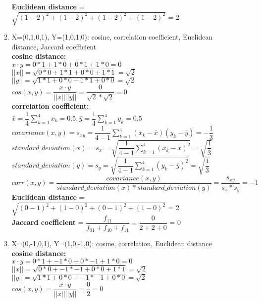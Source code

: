 \documentclass{article}%
\begin{document}
\begin{enumerate}
\begin{enumerate}
		\textbf{Euclidean distance} = $\sqrt{(1-2)^2 + (1-2)^2 + (1-2)^2 + (1-2)^2 }$ = 2\\
			
		\item X=(0,1,0,1), Y=(1,0,1,0): cosine, correlation coefficient, Euclidean distance, Jaccard coefficient \\
		\textbf{cosine distance:} \\
		$ x \cdot  y = 0*1+1*0+0*1+1*0 = 0$ \\
		$ ||x|| = \sqrt{0*0 + 1*1 + 0*0 + 1*1} = \sqrt{2} $ \\
		$ ||y|| = \sqrt{1*1 + 0*0 + 1*1 + 0*0} = \sqrt{2} $ \\
		$ cos(x,y) = \dfrac{x \cdot y }{ ||x|| ||y||} = \dfrac{0}{\sqrt{2}*\sqrt{2}} = 0 $\\
		
		
		\textbf{correlation coefficient:}\\
		$ \bar{x} = \dfrac{1}{4} \sum_{k=1}^4x_k=0.5, \bar{y} = \dfrac{1}{4} \sum_{k=1}^4y_k = 0.5 $ \\
		$ covariance(x,y) = s_{xy} = \dfrac{1}{4 - 1} \sum_{k=1}^{4}(x_k - \bar{x})(y_k-\bar{y}) = -\dfrac{1}{3}$	\\
		$ standard\_deviation(x) = s_{x} = \sqrt{\dfrac{1}{4-1}\sum_{k=1}^{4}(x_k - \bar{x})^2} = \sqrt{\dfrac{1}{3}}$	\\		
		$ standard\_deviation(y) = s_{y} = \sqrt{\dfrac{1}{4-1}\sum_{k=1}^{4}(y_k - \bar{y})^2} = \sqrt{\dfrac{1}{3}}$	\\		
		$ corr(x,y) = \dfrac{covariance(x,y)}{standard\_deviation(x)*standard\_deviation(y)} = \dfrac{s_{xy}}{s_x*s_y} = -1$	 \\
		
				
		\textbf{Euclidean distance} = $\sqrt{(0-1)^2 + (1-0)^2 + (0-1)^2 + (1-0)^2 }$ = 2\\	

		\textbf{Jaccard coefficient} = $\dfrac{f_{11}}{f_{01}+f_{10}+f_{11}} = \dfrac{0}{2+2+0}$ = 0\\	
		
		\item X=(0,-1,0,1), Y=(1,0,-1,0): cosine, correlation, Euclidean distance \\
		\textbf{cosine distance:} \\
		$ x \cdot  y = 0*1 + -1*0 + 0*-1 + 1*0  = 0$ \\
		$ ||x|| = \sqrt{0*0 + -1*-1 + 0*0 + 1*1} = \sqrt{2} $ \\
		$ ||y|| = \sqrt{1*1 + 0*0 + -1*-1 + 0*0} = \sqrt{2} $ \\
		$ cos(x,y) = \dfrac{x \cdot y }{ ||x|| ||y||} = \dfrac{0}{2} = 0 $\\
		

\end{enumerate}
\end{enumerate}
\end{document}
